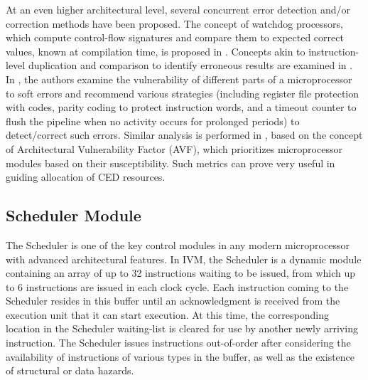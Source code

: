 \documentclass[12pt]{yalephd}
\begin{document}
At an even higher architectural level, several concurrent error detection and/or correction methods have been proposed. The concept of watchdog processors, which compute control-flow signatures and compare them to expected correct values, known at compilation time, is proposed in \cite{2145,JN08}. Concepts akin to instruction-level duplication and comparison to identify erroneous results are examined in \cite{MeSu00,941424}. In \cite{WQRP04}, the authors examine the vulnerability of different parts of a microprocessor to soft errors and recommend various strategies (including register file protection with codes, parity coding to protect instruction words, and a timeout counter to flush the pipeline when no activity occurs for prolonged periods) to detect/correct such errors. Similar analysis is performed in \cite{MWERA03}, based on the concept of Architectural Vulnerability Factor (AVF), which prioritizes microprocessor modules based on their susceptibility. Such metrics can prove very useful in guiding allocation of CED resources.

\subsection{Scheduler Module}\label{sC3sScheduler}

The Scheduler is one of the key control modules in any modern microprocessor with advanced architectural features. In IVM, the Scheduler is a dynamic module containing an array of up to 32 instructions waiting to be issued, from which up to 6 instructions are issued in each clock cycle. Each instruction coming to the Scheduler resides in this buffer until an acknowledgment is received from the execution unit that it can start execution. At this time, the corresponding location in the Scheduler waiting-list is cleared for use by another newly arriving instruction. The Scheduler issues instructions out-of-order after considering the availability of instructions of various types in the buffer, as well as the existence of structural or data hazards.
\end{document}
